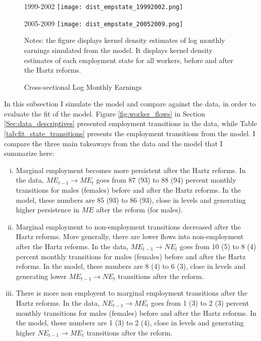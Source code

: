 \documentclass[12pt, a4paper]{article}
\begin{document}
\begin{figure}[!t]
	\centering
	\begin{minipage}[b]{0.48\textwidth}{1999-2002}
		\centering
		\texttt{[image: dist\_empstate\_19992002.png]}
	\end{minipage}
	\begin{minipage}[b]{0.48\textwidth}{2005-2009}
		\centering
		\texttt{[image: dist\_empstate\_20052009.png]}
	\end{minipage}
	\footnotesize{
		\justifying Notes: the figure displays kernel density estimates of log monthly earnings simulated from the model. It displays kernel density estimates of each employment state for all workers, before and after the Hartz reforms.\par}
	\captionsetup{font=small,justification=raggedright}
	\caption{Cross-sectional Log Monthly Earnings}\label{fig:estimation_monthly_distribution}
\end{figure}

In this subsection I simulate the model and compare against the data, in order to evaluate the fit of the model. Figure \ref{fig:worker_flows} in Section \ref{Sec:data_descriptives} presented employment transitions in the data, while Table \ref{tab:fit_state_transitions} presents the employment transitions from the model. I compare the three main takeaways from the data and the model that I summarize here:
\begin{enumerate}[i)]
	\item Marginal employment becomes more persistent after the Hartz reforms. In the data, $ME_{t-1}\rightarrow ME_{t}$ goes from 87 (93) to 88 (94) percent monthly transitions for males (females) before and after the Hartz reforms. In the model, these numbers are 85 (93) to 86 (93), close in levels and generating higher persistence in $ME$ after the reform (for males).
	\item Marginal employment to non-employment transitions decreased after the Hartz reforms. More generally, there are lower flows into non-employment after the Hartz reforms. In the data, $ME_{t-1}\rightarrow NE_{t}$ goes from 10 (5) to 8 (4) percent monthly transitions for males (females) before and after the Hartz reforms. In the model, these numbers are 8 (4) to 6 (3), close in levels and generating lower $ME_{t-1}\rightarrow NE_{t}$ transitions after the reform.
	\item There is more non employent to marginal employment transitions after the Hartz reforms. In the data, $NE_{t-1}\rightarrow ME_{t}$ goes from 1 (3) to 2 (3) percent monthly transitions for males (females) before and after the Hartz reforms. In the model, these numbers are 1 (3) to 2 (4), close in levels and generating higher $NE_{t-1}\rightarrow ME_{t}$ transitions after the reform.
\end{enumerate} 
\end{document}
